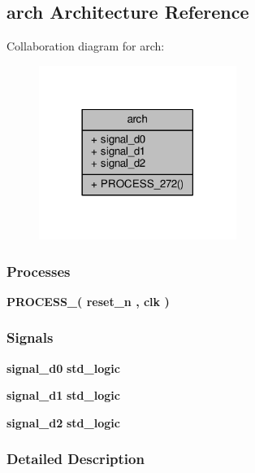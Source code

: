 \subsection{arch Architecture Reference}
\label{classsynchronizer_1_1arch}


Collaboration diagram for arch\+:\nopagebreak
\begin{figure}[H]
\begin{center}
\leavevmode
\includegraphics[width=182pt]{d5/d1f/classsynchronizer_1_1arch__coll__graph}
\end{center}
\end{figure}
\subsubsection*{Processes}
 \begin{DoxyCompactItemize}
\item 
{\bf P\+R\+O\+C\+E\+S\+S\+\_}{\bfseries  ( {\bfseries {\bfseries {\bf reset\+\_\+n}} \textcolor{vhdlchar}{ }} , {\bfseries {\bfseries {\bf clk}} \textcolor{vhdlchar}{ }} )}
\end{DoxyCompactItemize}
\subsubsection*{Signals}
 \begin{DoxyCompactItemize}
\item 
{\bf signal\+\_\+d0} {\bfseries \textcolor{comment}{std\+\_\+logic}\textcolor{vhdlchar}{ }} 
\item 
{\bf signal\+\_\+d1} {\bfseries \textcolor{comment}{std\+\_\+logic}\textcolor{vhdlchar}{ }} 
\item 
{\bf signal\+\_\+d2} {\bfseries \textcolor{comment}{std\+\_\+logic}\textcolor{vhdlchar}{ }} 
\end{DoxyCompactItemize}


\subsubsection{Detailed Description}



